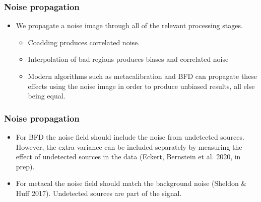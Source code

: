 \documentclass{beamer}
\begin{document}
\frame
{

    \frametitle{Noise propagation}

    \begin{itemize}

        \item We propagate a noise image through all of the relevant processing
            stages.

        \begin{itemize}

            \item Coadding produces correlated noise.

            \item Interpolation of bad regions produces biases and correlated
                noise

            \item Modern algorithms such as metacalibration and BFD can
                propagate these effects using the noise image in order to
                produce unbiased results, all else being equal.

        \end{itemize}


    \end{itemize}

}

\frame
{

    \frametitle{Noise propagation}

    \begin{itemize}

        \item For BFD the noise field should include the noise from undetected
            sources.  However, the extra variance can be included separately by
            measuring the effect of undetected sources in the data (Eckert, Bernstein et
            al. 2020, in prep).

        \item For metacal the noise field should match the background noise (Sheldon \& Huff 2017).
            Undetected sources are part of the signal.
            

    \end{itemize}

}
\end{document}
